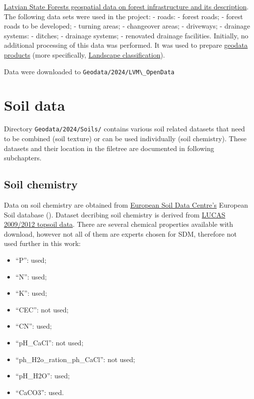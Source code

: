 \documentclass[
]{book}
\newcommand{\passthrough}[1]{#1}
\begin{document}
\href{https://data.gov.lv/dati/lv/dataset/as-latvijas-valsts-mezi-mezsaimniecibas-infrastruktura}{Latvian State Forests geospatial data on forest infrastructure and its description}. The
following data sets were used in the project:
- roads:
- forest roads;
- forest roads to be developed;
- turning areas;
- changeover areas;
- driveways;
- drainage systems:
- ditches;
- drainage systems;
- renovated drainage facilities.
Initially, no additional processing of this data was performed. It was used to
prepare \hyperref[Ch05]{geodata products} (more specifically, \hyperref[Ch05.03]{Landscape classification}).

Data were downloaded to \passthrough{\lstinline!Geodata/2024/LVM\_OpenData!}

\section{Soil data}\label{Ch04.07}

Directory \passthrough{\lstinline!Geodata/2024/Soils/!} contains various soil related datasets that need
to be combined (soil texture) or can be used individually (soil chemistry). These
datasets and their location in the filetree are documented in following subchapters.

\subsection{Soil chemistry}\label{Ch04.07.01}

Data on soil chemistry are obtained from \href{https://esdac.jrc.ec.europa.eu/}{European Soil Data Centre's} European
Soil database (). Dataset decribing soil chemistry is derived from \href{https://esdac.jrc.ec.europa.eu/content/chemical-properties-european-scale-based-lucas-topsoil-data}{LUCAS
2009/2012 topsoil data}. There are several chemical properties available with
download, however not all of them are experts chosen for SDM, therefore not used
further in this work:

\begin{itemize}
\item
  ``P'': used;
\item
  ``N'': used;
\item
  ``K'': used;
\item
  ``CEC'': not used;
\item
  ``CN'': used;
\item
  ``pH\_CaCl'': not used;
\item
  ``ph\_H2o\_ration\_ph\_CaCl'': not used;
\item
  ``pH\_H2O'': used;
\item
  ``CaCO3'': used.
\end{itemize}
\end{document}
